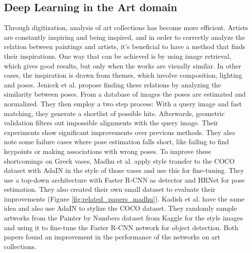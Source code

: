 \documentclass[conference]{IEEEtran}
\begin{document}
\subsection{Deep Learning in the Art domain}
Through digitization, analysis of art collections has become more efficient.
Artists are constantly inspiring and being inspired, and in order to correctly analyze the relation between paintings and artists, it's beneficial to have a method that finds their inspirations.
One way that can be achieved is by using image retrieval, which gives good results, but only when the works are visually similar.
In other cases, the inspiration is drawn from themes, which involve composition, lighting and poses.
Jenicek et al. \cite{Jenicek2019} propose finding these relations by analyzing the similarity between poses.
From a database of images the poses are estimated and normalized.
They then employ a two step process: With a query image and fast matching, they generate a shortlist of possible hits.
Afterwards, geometric validation filters out impossible alignments with the query image.
Their experiments show significant improvements over previous methods.
They also note some failure cases where pose estimation falls short, like failing to find keypoints or making associations with wrong poses.
To improve these shortcomings on Greek vases, Madhu et al. \cite{Madhu2020} apply style transfer to the COCO dataset with AdaIN in the style of those vases and use this for fine-tuning.
They use a top-down architecture with Faster R-CNN as detector and HRNet for pose estimation.
They also created their own small dataset to evaluate their improvements (Figure \ref{fig:related_papers_madhu}).
Kadish et al. \cite{Kadish2021} have the same idea and also use AdaIN to stylize the COCO dataset.
They randomly sample artworks from the Painter by Numbers dataset from Kaggle \cite{PainterByNumbers} for the style images and using it to fine-tune the Faster R-CNN network for object detection.
Both papers found an improvement in the performance of the networks on art collections.
\end{document}
